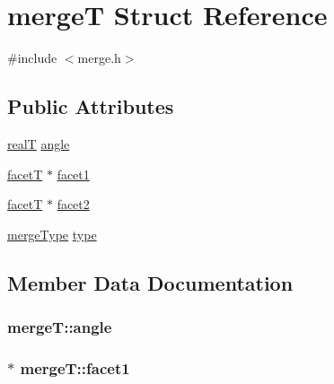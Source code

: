 \hypertarget{structmergeT}{}\section{merge\+T Struct Reference}
\label{structmergeT}


{\ttfamily \#include $<$merge.\+h$>$}

\subsection*{Public Attributes}
\begin{DoxyCompactItemize}
\item 
\hyperlink{user_8h_ad6fe71dff955732ea8682263e9540bb7}{real\+T} \hyperlink{structmergeT_add4a14f7619c9f91d08e650c39d4675f}{angle}
\item 
\hyperlink{structfacetT}{facet\+T} $\ast$ \hyperlink{structmergeT_a492ca931193e22bc39934682b8478a87}{facet1}
\item 
\hyperlink{structfacetT}{facet\+T} $\ast$ \hyperlink{structmergeT_a030c58a3ac681e54bfaae0d98408ef22}{facet2}
\item 
\hyperlink{merge_8h_ae83efaeb28f034bb4337119452c19495}{merge\+Type} \hyperlink{structmergeT_a5ce39a7a77cdb100b8cd3efa904b1fd9}{type}
\end{DoxyCompactItemize}


\subsection{Member Data Documentation}
\hypertarget{structmergeT_add4a14f7619c9f91d08e650c39d4675f}{}
\subsubsection[{angle}]{ merge\+T\+::angle}\label{structmergeT_add4a14f7619c9f91d08e650c39d4675f}
\hypertarget{structmergeT_a492ca931193e22bc39934682b8478a87}{}
\subsubsection[{facet1}]{$\ast$ merge\+T\+::facet1}\label{structmergeT_a492ca931193e22bc39934682b8478a87}
\hypertarget{structmergeT_a030c58a3ac681e54bfaae0d98408ef22}{}
